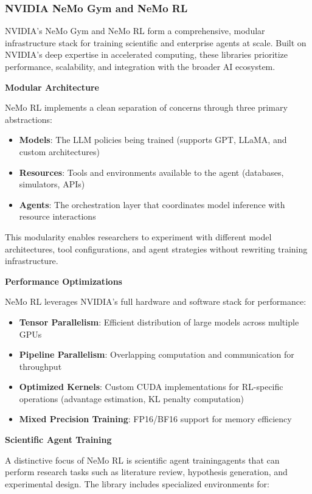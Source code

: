 \subsubsection{NVIDIA NeMo Gym and NeMo RL}

NVIDIA's NeMo Gym and NeMo RL form a comprehensive, modular infrastructure stack for training scientific and enterprise agents at scale. Built on NVIDIA's deep expertise in accelerated computing, these libraries prioritize performance, scalability, and integration with the broader AI ecosystem.

\textbf{Modular Architecture}

NeMo RL implements a clean separation of concerns through three primary abstractions:

\begin{itemize}
    \item \textbf{Models}: The LLM policies being trained (supports GPT, LLaMA, and custom architectures)
    \item \textbf{Resources}: Tools and environments available to the agent (databases, simulators, APIs)
    \item \textbf{Agents}: The orchestration layer that coordinates model inference with resource interactions

\end{itemize}
This modularity enables researchers to experiment with different model architectures, tool configurations, and agent strategies without rewriting training infrastructure.

\textbf{Performance Optimizations}

NeMo RL leverages NVIDIA's full hardware and software stack for performance:

\begin{itemize}
    \item \textbf{Tensor Parallelism}: Efficient distribution of large models across multiple GPUs
    \item \textbf{Pipeline Parallelism}: Overlapping computation and communication for throughput
    \item \textbf{Optimized Kernels}: Custom CUDA implementations for RL-specific operations (advantage estimation, KL penalty computation)
    \item \textbf{Mixed Precision Training}: FP16/BF16 support for memory efficiency

\end{itemize}
\textbf{Scientific Agent Training}

A distinctive focus of NeMo RL is scientific agent trainingagents that can perform research tasks such as literature review, hypothesis generation, and experimental design. The library includes specialized environments for:

